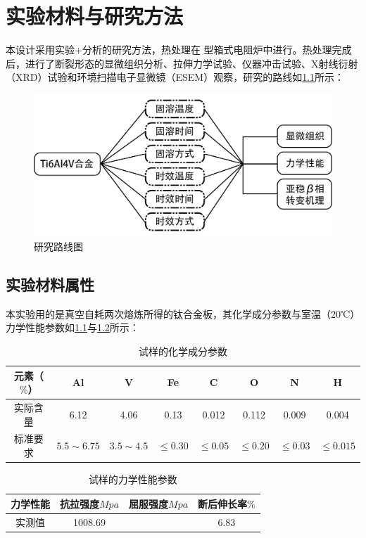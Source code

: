 \chapter{实验材料与研究方法}

本设计采用实验+分析的研究方法，热处理在%
型箱式电阻炉中进行。热处理完成后，进行了断裂形态的显微组织分析、拉伸力学试验、仪器冲击试验、X射线衍射（XRD）试验和环境扫描电子显微镜（ESEM）观察，研究的路线如\ref{fig:roadmap}所示：

\begin{figure}[h!]
	\centering
	\includegraphics[width=0.8\linewidth]{pic/路线图}
	\caption{研究路线图}
	\label{fig:roadmap}
\end{figure}
\section{实验材料属性}
本实验用的是真空自耗两次熔炼所得的钛合金板，其化学成分参数与室温（20℃）力学性能参数如\ref{sec:mytc4chem}与\ref{sec:mytc4machin}所示：
\begin{table}[htbp]
	\centering
	\caption{试样的化学成分参数}
	\label{sec:mytc4chem}
	\begin{tabular}{cccccccc}
		\toprule
		元素（$ \% $） & Al & V &Fe &C& O& N &H \\ \midrule
		实际含量 & 6.12&4.06 &0.13 &0.012&0.112&0.009&0.004  \\
		标准要求 &$ 5.5\sim 6.75 $ & $ 3.5\sim 4.5 $&$ \le 0.30 $ & $ \le 0.05 $&$ \le 0.20 $&$ \le 0.03$ &$ \le 0.015 $ \\ \bottomrule
	\end{tabular}
\end{table}
\begin{table}[htbp]
	\centering
	\caption{试样的力学性能参数}
	\label{sec:mytc4machin}
	\begin{tabular}{cccc}
		\toprule
		力学性能& 抗拉强度$Mpa  $& 屈服强度$ Mpa $&断后伸长率$ \% $\\ \midrule
		实测值 & 1008.69 & & 6.83\\ \bottomrule
	\end{tabular}
\end{table}

